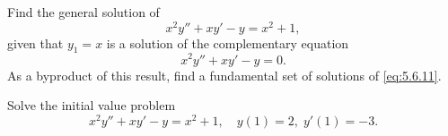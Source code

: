\setcounter{example}{1}
\setcounter{equation}{10}
\begin{example}
  \label{example:5.6.2}\rm \mbox{}
  \newline
  \begin{alist}
    \item %
    Find the general solution of
    \[
      x^{2}y''+xy'-y=x^{2}+1,
    \]
    given that $y_{1}=x$ is a solution of the complementary equation
    \begin{equation}
      \label{eq:5.6.11}x^{2}y''+xy'-y=0.
    \end{equation}
    As a byproduct of this result, find a fundamental set of solutions of \eqref{eq:5.6.11}.

    \item %
    Solve the initial value problem
    \begin{equation}
      \label{eq:5.6.12}x^{2}y''+xy'-y=x^{2}+1,\quad y(1)=2,\;y'(1)=-3.
    \end{equation}
  \end{alist}
\end{example}
\setcounter{equation}{12}
